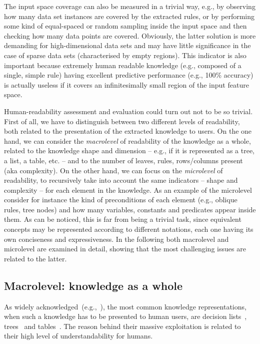 \documentclass[sigconf]{acmart}
\begin{document}
The input space coverage can also be measured in a trivial way, e.g., by observing how many data set instances are covered by the extracted rules, or by performing some kind of equal-spaced or random sampling inside the input space and then checking how many data points are covered.
%
Obviously, the latter solution is more demanding for high-dimensional data sets and may have little significance in the case of sparse data sets (characterised by empty regions).
%
This indicator is also important because extremely human readable knowledge (e.g., composed of a single, simple rule) having excellent predictive performance (e.g., 100\% accuracy) is actually useless if it covers an infinitesimally small region of the input feature space.

Human-readability assessment and evaluation could turn out not to be so trivial.
%
First of all, we have to distinguish between two different levels of readability, both related to the presentation of the extracted knowledge to users.
%
On the one hand, we can consider the \emph{macrolevel} of readability of the knowledge as a whole, related to the knowledge shape and dimension -- e.g., if it is represented as a tree, a list, a table, etc. -- and to the number of leaves, rules, rows/columns present (aka complexity).
%
On the other hand, we can focus on the \emph{microlevel} of readability, to recursively take into account the same indicators -- shape and complexity -- for each element in the knowledge.
%
As an example of the microlevel consider for instance the kind of preconditions of each element (e.g., oblique rules, \mofn{} tree nodes) and how many variables, constants and predicates appear inside them.
%
As can be noticed, this is far from being a trivial task, since equivalent concepts may be represented according to different notations, each one having its own conciseness and expressiveness.
%
In the following both macrolevel and microlevel are examined in detail, showing that the most challenging issues are related to the latter.

\subsection{Macrolevel: knowledge as a whole}\label{ssec:macro}

As widely acknowledged~(e.g.,~\cite{guidotti2018survey}), the most common knowledge representations, when such a knowledge has to be presented to human users, are decision lists~\cite{freitas2014comprehensible,huysmans2011empirical}, trees~\cite{quinlan1993c4,breiman1984classification} and tables~\cite{sethi2012kdruleex}.
%
The reason behind their massive exploitation is related to their high level of understandability for humans.
\end{document}

